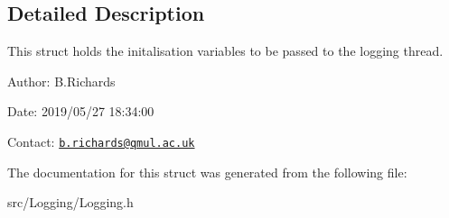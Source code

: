 \subsection{Detailed Description}
This struct holds the initalisation variables to be passed to the logging thread.

\begin{DoxyParagraph}{Author\-:}
B.\-Richards 
\end{DoxyParagraph}
\begin{DoxyParagraph}{Date\-:}
2019/05/27 18\-:34\-:00 
\end{DoxyParagraph}
Contact\-: \href{mailto:b.richards@qmul.ac.uk}{\tt b.\-richards@qmul.\-ac.\-uk} 

The documentation for this struct was generated from the following file\-:\begin{DoxyCompactItemize}
\item 
src/\-Logging/Logging.\-h\end{DoxyCompactItemize}
